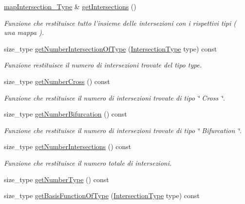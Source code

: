\begin{DoxyCompactItemize}
\hyperlink{classFractureIntersect_a4eea7d0aca48cdd36ea1756e75280332}{map\-Intersection\-\_\-\-Type} \& \hyperlink{classFractureIntersect_a1b785b0ed94d3a403b9f0e21f092b4ab}{get\-Intersections} ()
\begin{DoxyCompactList}\small\item\em Funzione che restituisce tutto l'insieme delle intersezioni con i rispettivi tipi ( una mappa ). \end{DoxyCompactList}\item 
size\-\_\-type \hyperlink{classFractureIntersect_a1cd070dda9460d884c1b1d92edfecc12}{get\-Number\-Intersection\-Of\-Type} (\hyperlink{classFractureIntersect_a9a4e4a784fa4c8e359767ed543f89dc5}{Intersection\-Type} type) const 
\begin{DoxyCompactList}\small\item\em Funzione restituisce il numero di intersezioni trovate del tipo type. \end{DoxyCompactList}\item 
size\-\_\-type \hyperlink{classFractureIntersect_a8d9f707319b9b83744b6e03f19003734}{get\-Number\-Cross} () const 
\begin{DoxyCompactList}\small\item\em Funzione che restituisce il numero di intersezioni trovate di tipo \char`\"{} Cross \char`\"{}. \end{DoxyCompactList}\item 
size\-\_\-type \hyperlink{classFractureIntersect_afba7c92096a4b92a27fcb4f1158c7279}{get\-Number\-Bifurcation} () const 
\begin{DoxyCompactList}\small\item\em Funzione che restituisce il numero di intersezioni trovate di tipo \char`\"{} Bifurcation \char`\"{}. \end{DoxyCompactList}\item 
size\-\_\-type \hyperlink{classFractureIntersect_aaff97a1338251e796ce44db631961459}{get\-Number\-Intersections} () const 
\begin{DoxyCompactList}\small\item\em Funzione che restituisce il numero totale di intersezioni. \end{DoxyCompactList}\item 
size\-\_\-type \hyperlink{classFractureIntersect_a86195f7e54a79412d2d54fa5efad9af2}{get\-Number\-Type} () const 
\item 
size\-\_\-type \hyperlink{classFractureIntersect_a8293ef859c572a375c7c5f6e79399b1e}{get\-Basis\-Function\-Of\-Type} (\hyperlink{classFractureIntersect_a9a4e4a784fa4c8e359767ed543f89dc5}{Intersection\-Type} type) const 
\end{DoxyCompactItemize}


